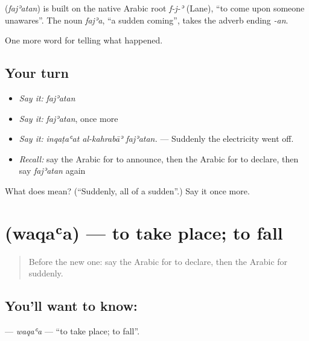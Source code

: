 \begin{cousinweb}
\textbf{} (\emph{fajʾatan}) is built on the native Arabic root \emph{f-j-ʾ} (Lane), \textquotedblleft{}to come upon someone unawares\textquotedblright{}. The noun \emph{fajʾa}, \textquotedblleft{}a sudden coming\textquotedblright{}, takes the adverb ending \emph{-an}.
\end{cousinweb}

\begin{grammarlens}[title={What you've built}]
One more word for telling what happened.
\end{grammarlens}

\subsection*{Your turn}
\begin{itemize}
\raggedright
  \item \emph{Say it:} \emph{fajʾatan}
  \item \emph{Say it:} \emph{fajʾatan}, once more
  \item \emph{Say it:} \emph{inqaṭaʿat al-kahrabāʾ fajʾatan.} — Suddenly the electricity went off.
  \item \emph{Recall:} say the Arabic for to announce, then the Arabic for to declare, then say \emph{fajʾatan} again
\end{itemize}

\begin{tcolorbox}[breakable,colback=teal!4,colframe=teal!35!black,title={Before you move on}]
What does  mean? (\textquotedblleft{}Suddenly, all of a sudden\textquotedblright{}.) Say it once more.
\end{tcolorbox}
\section[\texorpdfstring{\ar{وقع} (waqaʿa)}{وقع (waqaʿa)}]{ (waqaʿa) — to take place; to fall}

\label{lesson:AR-C294-waqaa}



\begin{quote}
Before the new one: say the Arabic for to declare, then the Arabic for suddenly.
\end{quote}

\subsection*{You'll want to know: }
\textbf{} — \emph{waqaʿa} — \textquotedblleft{}to take place; to fall\textquotedblright{}.

